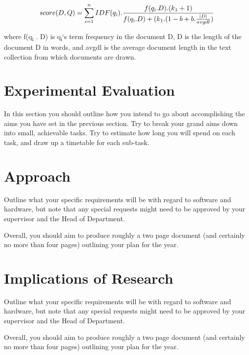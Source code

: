 \documentclass[conference]{IEEEtran}
\begin{document}
\[ score (D, Q) = \sum_{i=1}^{n} IDF (q\textsubscript{i}) . \frac{f(q\textsubscript{i} . D) .(k\textsubscript{1} + 1)}           {f(q\textsubscript{i} . D) + (k\textsubscript{1} . (1 - b + b . \frac{|D|}{avgdl}) } \]


where f(q\textsubscript{i} . D) is q\textsubscript{i}`s term frequency in the document D, D is the length of the document D in words, and avgdl is the average document length in the text collection from which documents are drawn.



\section*{Experimental Evaluation}
In this section you should outline how you intend to go
about accomplishing the aims you have set in the previous
section. Try to break your grand aims down into small,
achievable tasks. Try to estimate how long you will
spend on each task, and draw up a timetable for each
sub-task.

\section*{Approach}
Outline what your specific requirements will be with regard
to software and hardware, but note that any special requests
might need to be approved by your supervisor and the Head of
Department.

Overall, you should aim to produce roughly a two page document
(and certainly no more than four pages)
outlining your plan for the year.

\section*{Implications of Research}
Outline what your specific requirements will be with regard
to software and hardware, but note that any special requests
might need to be approved by your supervisor and the Head of
Department.

Overall, you should aim to produce roughly a two page document
(and certainly no more than four pages)
outlining your plan for the year.
\end{document}
